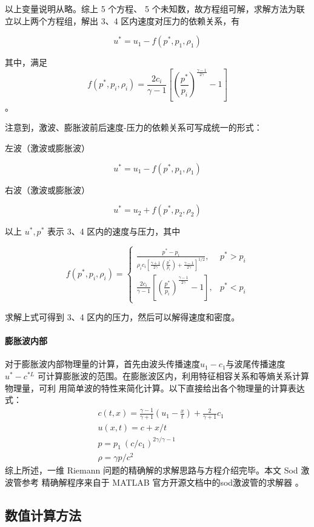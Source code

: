 \documentclass[UTF8]{ctexart}
\begin{document}
以上变量说明从略。综上 5 个方程、 5 个未知数，故方程组可解，求解方法为联立以上两个方程组，解出 3、4 区内速度对压力的依赖关系，有

$$u^{*}=u_{1}-f(p^{*},p_{1},\rho_{1})$$

其中，满足 $$f(p^{*},p_{i},\rho_{i})=\frac{2c_{i}}{\gamma-1}\left[\left(\frac{p^{*}}{p_{i}}\right)^{\frac{\gamma-1}{2\gamma}}-1\right]$$。

注意到，激波、膨胀波前后速度-压力的依赖关系可写成统一的形式：

左波（激波或膨胀波）

$$u^{*}=u_{1}-f(p^{*},p_{1},\rho_{1})$$

右波（激波或膨胀波）

$$u^{*}=u_{2}+f(p^{*},p_{2},\rho_{2})$$

以上 $u^{*},p^{*}$ 表示 3、4 区内的速度与压力，其中

$$f(p^{*},p_{i},\rho_{i})=\left\{\begin{array}{ll}\frac{p^{*}-p_{i}}{\rho_{i}c_{i}\left[\frac{\gamma+1}{2\gamma}\left(\frac{p^{*}}{p_{i}}\right)+\frac{\gamma-1}{2\gamma}\right]^{1/2}}, & p^{*}>p_{i}\\\frac{2c_{i}}{\gamma-1}\left[\left(\frac{p^{*}}{p_{i}}\right)^{\frac{\gamma-1}{2\gamma}}-1\right], & p^{*}<p_{i}\end{array}\right.$$

求解上式可得到 3、4 区内的压力，然后可以解得速度和密度。
\paragraph{膨胀波内部}

对于膨胀波内部物理量的计算，首先由波头传播速度$u_1-c_1$与波尾传播速度$u^*-c^{*L}$
可计算膨胀波的范围。在膨胀波区内，利用特征相容关系和等熵关系计算物理量，可利
用简单波的特性来简化计算。以下直接给出各个物理量的计算表达式：
$$\begin{aligned}&c(t,x)=\frac{\gamma-1}{\gamma+1}\left(u_{1}-\frac{x}{t}\right)+\frac{2}{\gamma+1}c_{1}\\&u(x,t)=c+x/t\\&p=p_{1}\:(c/c_{1})^{2\gamma/\gamma-1}\\&\rho=\gamma p/c^{2}\end{aligned}$$
综上所述，一维 Riemann 问题的精确解的求解思路与方程介绍完毕。本文 Sod 激波管参考
精确解程序来自于 MATLAB 官方开源文档中的sod激波管的求解器 \cite{gogol2025}。

\subsection{数值计算方法}
\end{document}
